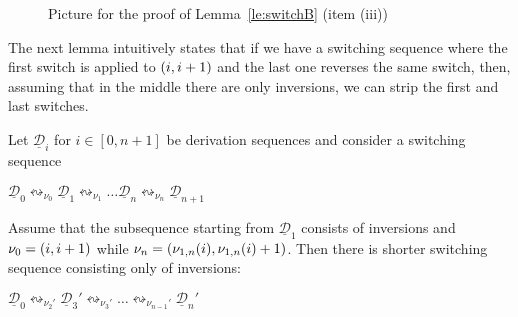 \documentclass[a4paper,UKenglish,cleveref,pdftex, thm-restate,numberwithinsect,anonymous]{lipics}
\newcommand{\interval}[2][1]{\ensuremath{[{#1},{#2}]}}
\newcommand{\dder}[1]{\mathscr{#1}}
\newcommand{\der}[1]{\underline{\dder{#1}}}
\newcommand{\shift}[1]{\ensuremath{\mathrel{{\leftrightsquigarrow}_{#1}}}}
\begin{document}
\begin{figure}
  \caption{Picture for the proof of Lemma~\ref{le:switchB} (item (iii))}
  \label{fi:switchB2}
\end{figure}

The next lemma intuitively states that if we have a switching sequence
where the first switch is applied to $\transp{i}$ and the last one
reverses the same switch, then, assuming that in the middle there are
only inversions, we can strip the first and last switches.

\begin{lemma}
  \label{le:switchC}
  Let $\der{D}_i$ for $i \in \interval[0]{n+1}$ be derivation sequences
  and consider a switching sequence
  \begin{center}
    $\der{D}_0 \shift{\nu_0} \der{D}_1 \shift{\nu_1} \ldots
     \der{D}_n \shift{\nu_n} \der{D}_{n+1}$
  \end{center}
  Assume that the subsequence starting from $\der{D}_1$ consists of
  inversions and $\nu_0=\transp{i}$ while
  $\nu_n = \transp{\nu_{1,n}(i)}$.  Then there is shorter switching sequence
  consisting only of inversions:
  \begin{center}
    $\der{D}_0 \shift{\nu_2'} \der{D}_3' \shift{\nu_3'} \ldots
    \shift{\nu_{n-1}'} \der{D}_n'$
  \end{center}
\end{lemma}
\end{document}
